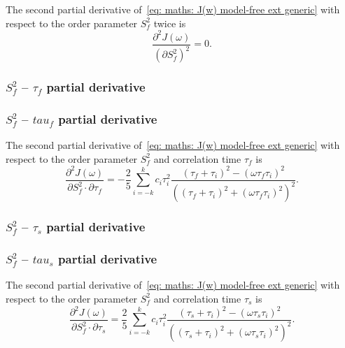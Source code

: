 The second partial derivative of~\eqref{eq: maths: J(w) model-free ext generic} with respect to the order parameter $S^2_f$ twice is
\begin{equation}
    \frac{\partial^2 J(\omega)}{(\partial S^2_f)^2} = 0.
\end{equation}



\begin{latexonly}
    \subsubsection{$S^2_f$ -- $\tau_f$ partial derivative}
\end{latexonly}
\begin{htmlonly}
    \subsubsection{$S^2_f$ -- $tau_f$ partial derivative}
\end{htmlonly}

The second partial derivative of~\eqref{eq: maths: J(w) model-free ext generic} with respect to the order parameter $S^2_f$ and correlation time $\tau_f$ is
\begin{equation}
    \frac{\partial^2 J(\omega)}{\partial S^2_f \cdot \partial \tau_f} = -\frac{2}{5} \sum_{i=-k}^k c_i \tau_i^2
        \frac{(\tau_f + \tau_i)^2 - (\omega \tau_f \tau_i)^2}{\left((\tau_f + \tau_i)^2 + (\omega \tau_f \tau_i)^2 \right)^2}.
\end{equation}



\begin{latexonly}
    \subsubsection{$S^2_f$ -- $\tau_s$ partial derivative}
\end{latexonly}
\begin{htmlonly}
    \subsubsection{$S^2_f$ -- $tau_s$ partial derivative}
\end{htmlonly}

The second partial derivative of~\eqref{eq: maths: J(w) model-free ext generic} with respect to the order parameter $S^2_f$ and correlation time $\tau_s$ is
\begin{equation}
    \frac{\partial^2 J(\omega)}{\partial S^2_f \cdot \partial \tau_s} = \frac{2}{5} \sum_{i=-k}^k c_i \tau_i^2
        \frac{(\tau_s + \tau_i)^2 - (\omega \tau_s \tau_i)^2}{\left((\tau_s + \tau_i)^2 + (\omega \tau_s \tau_i)^2 \right)^2}.
\end{equation}



